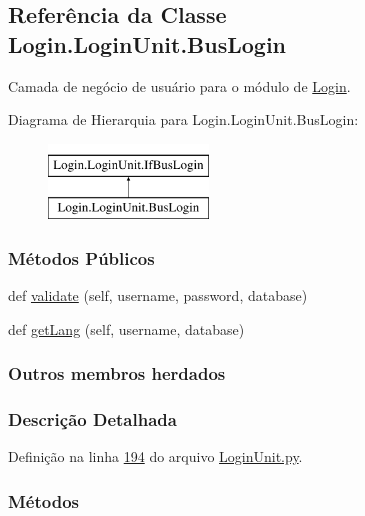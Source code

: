 \hypertarget{classLogin_1_1LoginUnit_1_1BusLogin}{}\subsection{Referência da Classe Login.\+Login\+Unit.\+Bus\+Login}
\label{classLogin_1_1LoginUnit_1_1BusLogin}


Camada de negócio de usuário para o módulo de \hyperlink{namespaceLogin}{Login}.  


Diagrama de Hierarquia para Login.\+Login\+Unit.\+Bus\+Login\+:\begin{figure}[H]
\begin{center}
\leavevmode
\includegraphics[height=2.000000cm]{d9/d51/classLogin_1_1LoginUnit_1_1BusLogin}
\end{center}
\end{figure}
\subsubsection*{Métodos Públicos}
\begin{DoxyCompactItemize}
\item 
def \hyperlink{classLogin_1_1LoginUnit_1_1BusLogin_a88b18ffaeaa3a53934aa38338de3b1c0}{validate} (self, username, password, database)
\item 
def \hyperlink{classLogin_1_1LoginUnit_1_1BusLogin_a5f4d3b7661b5061dc8a51c55f34ab169}{get\+Lang} (self, username, database)
\end{DoxyCompactItemize}
\subsubsection*{Outros membros herdados}


\subsubsection{Descrição Detalhada}


Definição na linha \hyperlink{LoginUnit_8py_source_l00194}{194} do arquivo \hyperlink{LoginUnit_8py_source}{Login\+Unit.\+py}.



\subsubsection{Métodos}
\hypertarget{classLogin_1_1LoginUnit_1_1BusLogin_a5f4d3b7661b5061dc8a51c55f34ab169}{}
